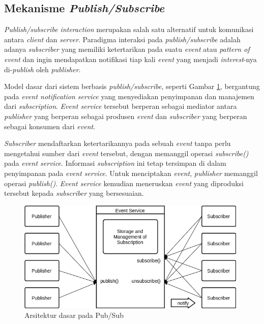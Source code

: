 \subsection{Mekanisme \textit{Publish/Subscribe}}
\label{ssec:pub-sub-mechanism}
\textit{Publish/subscribe interaction} merupakan salah satu alternatif untuk komunikasi antara \textit{client} dan \textit{server}. Paradigma interaksi pada \textit{publish/subscribe} adalah adanya \textit{subscriber} yang memiliki ketertarikan pada suatu \textit{event} atau \textit{pattern of event} dan ingin mendapatkan notifikasi tiap kali \textit{event} yang menjadi \textit{interest}-nya di-\textit{publish} oleh \textit{publisher}.


Model dasar dari sistem berbasis \textit{publish/subscribe}, seperti Gambar \ref{fig:pub-sub-general}, bergantung pada \textit{event notification service} yang menyediakan penyimpanan dan manajemen dari \textit{subscription}. \textit{Event service} tersebut berperan sebagai mediator antara \textit{publisher} yang berperan sebagai produsen \textit{event} dan \textit{subscriber} yang berperan sebagai konsumen dari \textit{event}. 


\textit{Subscriber} mendaftarkan ketertarikannya pada sebuah \textit{event} tanpa perlu mengetahui sumber dari \textit{event} tersebut, dengan memanggil operasi \textit{subscribe()} pada \textit{event service}. Informasi \textit{subscription} ini tetap tersimpan di dalam penyimpanan pada \textit{event service}. Untuk menciptakan \textit{event}, \textit{publisher} memanggil operasi \textit{publish()}. \textit{Event service} kemudian meneruskan \textit{event} yang diproduksi tersebut kepada \textit{subscriber} yang bersesuaian.


\begin{figure}[!]
	\centering
	\includegraphics[width=11cm]{Resources/Images/pub-sub-general}
	\captionsetup{format=hang}
	\caption{Arsitektur dasar pada Pub/Sub \citep{eugster_many_2003}}
	\label{fig:pub-sub-general}
\end{figure}


